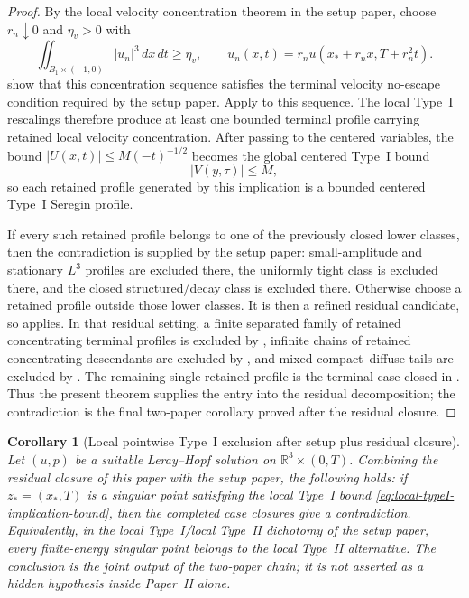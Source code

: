 \documentclass[11pt]{amsart}
\numberwithin{equation}{section}
\theoremstyle{plain}
\newtheorem{corollary}[corollary]{Corollary}
\theoremstyle{definition}
\theoremstyle{remark}
\newcommand{\R}{\mathbb R}
\begin{document}
\begin{proof}
By the local velocity concentration theorem in the setup paper, choose
\(r_n\downarrow0\) and \(\eta_v>0\) with
\[
   \iint_{B_1\times(-1,0)} |u_n|^3\,dx\,dt\ge\eta_v,
   \qquad
   u_n(x,t)=r_nu(x_*+r_nx,T+r_n^2t).
\]
show that this concentration sequence satisfies the terminal
velocity no-escape condition required by the setup paper.
Apply  to this sequence.  The
local Type~I rescalings therefore produce at least one bounded terminal profile
carrying retained local velocity concentration.  After passing to the centered variables, the
bound \(|U(x,t)|\le M(-t)^{-1/2}\) becomes the global centered Type~I bound
\[
   |V(y,\tau)|\le M,
\]
so each retained profile generated by this implication is a bounded centered Type~I
Seregin profile.

If every such retained profile belongs to one of the previously closed lower
classes, then the contradiction is supplied by the setup paper:
small-amplitude and stationary \(L^3\) profiles are excluded there, the
uniformly tight class is excluded there, and the closed structured/decay class
is excluded there.  Otherwise choose a retained profile outside those lower
classes.  It is then a refined residual candidate, so
 applies.  In that residual
setting, a finite separated family of retained concentrating terminal profiles
is excluded by , infinite chains of
retained concentrating descendants are excluded by , and mixed
compact--diffuse tails are excluded by .  The
remaining single retained profile is the terminal case closed in
.  Thus the present theorem supplies the entry into
the residual decomposition; the contradiction is the final two-paper corollary
proved after the residual closure.
\end{proof}

\begin{corollary}[Local pointwise Type~I exclusion after setup plus residual closure]
\label{cor:local-typeI-unconditional}
Let \((u,p)\) be a suitable Leray--Hopf solution on
\(\R^3\times(0,T)\).  Combining the residual closure
 of this paper with
the setup paper, the following holds: if \(z_*=(x_*,T)\) is a singular point
satisfying the local Type~I bound \eqref{eq:local-typeI-implication-bound}, then the
completed case closures give a contradiction.  Equivalently, in the local
Type~I/local Type~II dichotomy of the setup paper, every finite-energy
singular point belongs to the local Type~II alternative.  The conclusion is
the joint output of the two-paper chain; it is not asserted as a hidden
hypothesis inside Paper~II alone.
\end{corollary}
\end{document}
